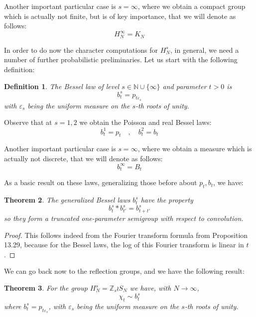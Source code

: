 \documentclass[12pt]{amsbook}
\newtheorem{theorem}{Theorem}[chapter]
\newtheorem{definition}[theorem]{Definition}
\begin{document}
Another important particular case is $s=\infty$, where we obtain a compact group which is actually not finite, but is of key importance, that we will denote as follows:
$$H_N^\infty=K_N$$

In order to do now the character computations for $H_N^s$, in general, we need a number of further probabilistic preliminaries. Let us start with the following definition:


\begin{definition}
The Bessel law of level $s\in\mathbb N\cup\{\infty\}$ and parameter $t>0$ is
$$b_t^s=p_{t\varepsilon_s}$$
with $\varepsilon_s$ being the uniform measure on the $s$-th roots of unity.
\end{definition}

Observe that at $s=1,2$ we obtain the Poisson and real Bessel laws:
$$b^1_t=p_t\quad,\quad 
b^2_t=b_t$$

Another important particular case is $s=\infty$, where we obtain a measure which is actually not discrete, that we will denote as follows:
$$b^\infty_t=B_t$$

As a basic result on these laws, generalizing those before about $p_t,b_t$, we have:

\begin{theorem}
The generalized Bessel laws $b^s_t$ have the property
$$b^s_t*b^s_{t'}=b^s_{t+t'}$$
so they form a truncated one-parameter semigroup
with respect to convolution.
\end{theorem}

\begin{proof}
This follows indeed from the Fourier transform formula from Proposition 13.29, because for the Bessel laws, the log of this Fourier transform is linear in $t$.
\end{proof}

We can go back now to the reflection groups, and we have the following result:

\begin{theorem}
For the group $H_N^s=\mathbb Z_s\wr S_N$ we have, with $N\to\infty$,
$$\chi_t\sim b^s_t$$
where $b_t^s=p_{t\varepsilon_s}$, with $\varepsilon_s$ being the uniform measure on the $s$-th roots of unity.
\end{theorem}
\end{document}
